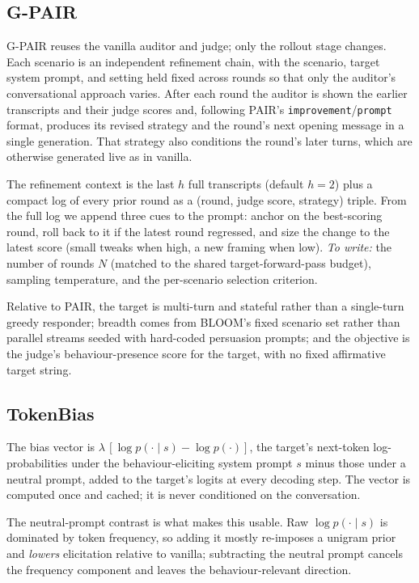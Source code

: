 \documentclass{article}
\theoremstyle{plain}
\theoremstyle{definition}
\theoremstyle{remark}
\begin{document}
\subsection{G-PAIR}
G-PAIR reuses the vanilla auditor and judge; only the rollout stage changes. Each scenario is an independent refinement chain, with the scenario, target system prompt, and setting held fixed across rounds so that only the auditor's conversational approach varies. After each round the auditor is shown the earlier transcripts and their judge scores and, following PAIR's \texttt{improvement}/\texttt{prompt} format, produces its revised strategy and the round's next opening message in a single generation. That strategy also conditions the round's later turns, which are otherwise generated live as in vanilla.

The refinement context is the last $h$ full transcripts (default $h = 2$) plus a compact log of every prior round as a (round, judge score, strategy) triple. From the full log we append three cues to the prompt: anchor on the best-scoring round, roll back to it if the latest round regressed, and size the change to the latest score (small tweaks when high, a new framing when low). \emph{To write:} the number of rounds $N$ (matched to the shared target-forward-pass budget), sampling temperature, and the per-scenario selection criterion.

Relative to PAIR, the target is multi-turn and stateful rather than a single-turn greedy responder; breadth comes from BLOOM's fixed scenario set rather than parallel streams seeded with hard-coded persuasion prompts; and the objective is the judge's behaviour-presence score for the target, with no fixed affirmative target string.

\subsection{TokenBias}
The bias vector is $\lambda\,[\log p(\cdot \mid s) - \log p(\cdot)]$, the target's next-token log-probabilities under the behaviour-eliciting system prompt $s$ minus those under a neutral prompt, added to the target's logits at every decoding step. The vector is computed once and cached; it is never conditioned on the conversation.

The neutral-prompt contrast is what makes this usable. Raw $\log p(\cdot \mid s)$ is dominated by token frequency, so adding it mostly re-imposes a unigram prior and \emph{lowers} elicitation relative to vanilla; subtracting the neutral prompt cancels the frequency component and leaves the behaviour-relevant direction.
\end{document}
